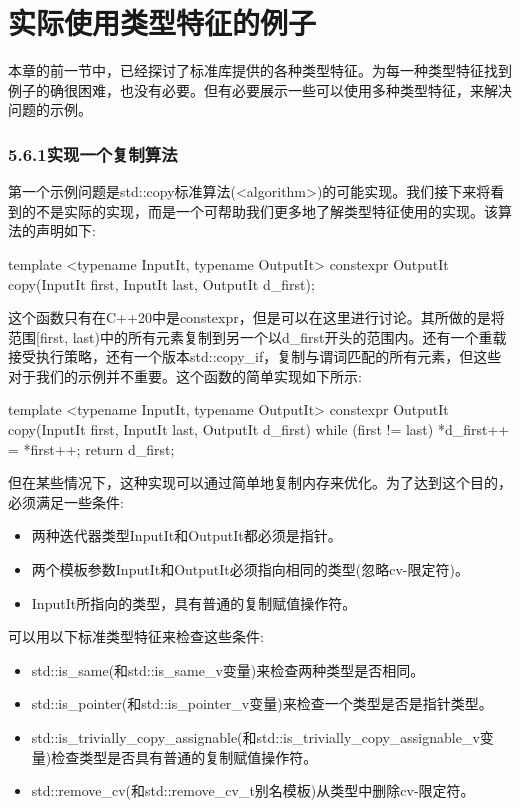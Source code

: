 \section{实际使用类型特征的例子}

本章的前一节中，已经探讨了标准库提供的各种类型特征。为每一种类型特征找到例子的确很困难，也没有必要。但有必要展示一些可以使用多种类型特征，来解决问题的示例。

\subsubsection{5.6.1\hspace{0.2cm}实现一个复制算法}

第一个示例问题是std::copy标准算法(<algorithm>)的可能实现。我们接下来将看到的不是实际的实现，而是一个可帮助我们更多地了解类型特征使用的实现。该算法的声明如下:

\begin{cpp}
template <typename InputIt, typename OutputIt>
constexpr OutputIt copy(InputIt first, InputIt last,
						OutputIt d_first);
\end{cpp}

这个函数只有在C++20中是constexpr，但是可以在这里进行讨论。其所做的是将范围[first, last)中的所有元素复制到另一个以d\_first开头的范围内。还有一个重载接受执行策略，还有一个版本std::copy\_if，复制与谓词匹配的所有元素，但这些对于我们的示例并不重要。这个函数的简单实现如下所示:

\begin{cpp}
template <typename InputIt, typename OutputIt>
constexpr OutputIt copy(InputIt first, InputIt last,
						OutputIt d_first)
{
	while (first != last)
	{
		*d_first++ = *first++;
	}
	return d_first;
}
\end{cpp}

但在某些情况下，这种实现可以通过简单地复制内存来优化。为了达到这个目的，必须满足一些条件:

\begin{itemize}
\item
两种迭代器类型InputIt和OutputIt都必须是指针。

\item
两个模板参数InputIt和OutputIt必须指向相同的类型(忽略cv-限定符)。

\item
InputIt所指向的类型，具有普通的复制赋值操作符。
\end{itemize}

可以用以下标准类型特征来检查这些条件:

\begin{itemize}
\item
std::is\_same(和std::is\_same\_v变量)来检查两种类型是否相同。

\item
std::is\_pointer(和std::is\_pointer\_v变量)来检查一个类型是否是指针类型。

\item
std::is\_trivially\_copy\_assignable(和std::is\_trivially\_copy\_assignable\_v变量)检查类型是否具有普通的复制赋值操作符。

\item
std::remove\_cv(和std::remove\_cv\_t别名模板)从类型中删除cv-限定符。
\end{itemize}

